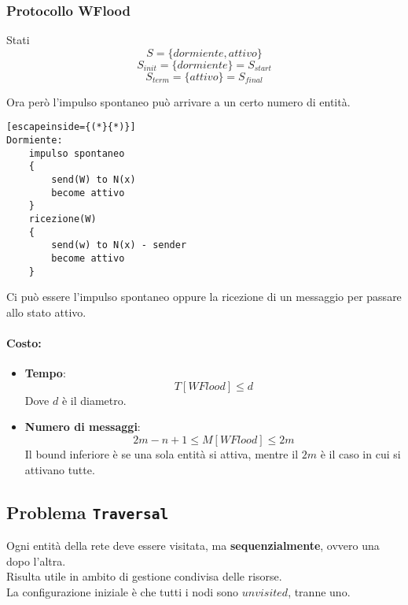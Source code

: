 \subsubsection{Protocollo WFlood}
Stati
$$ S = \{dormiente, attivo\} $$
$$ S_{init} = \{dormiente\} = S_{start} $$
$$ S_{term} = \{attivo\} = S_{final} $$

Ora però l'impulso spontaneo può arrivare a un certo numero di entità.\\

\begin{lstlisting}[escapeinside={(*}{*)}]
Dormiente:
	impulso spontaneo
	{
		send(W) to N(x)
		become attivo
	}
	ricezione(W)
	{
		send(w) to N(x) - sender
		become attivo
	}
\end{lstlisting}

Ci può essere l'impulso spontaneo oppure la ricezione di un messaggio per passare allo stato attivo.\\

\newpage

\paragraph{Costo:}
\begin{itemize}
	\item \textbf{Tempo}: 
	$$ T[WFlood] \leq d $$
	Dove $d$ è il diametro.\\
	
	\item \textbf{Numero di messaggi}:
	$$ 2m - n + 1 \leq M[WFlood] \leq 2m $$
	Il bound inferiore è se una sola entità si attiva, mentre il $2m$ è il caso in cui si attivano tutte.\\
\end{itemize}


\newpage

\subsection{Problema \texttt{Traversal}}

Ogni entità della rete deve essere visitata, ma \textbf{sequenzialmente}, ovvero una dopo l'altra.\\
Risulta utile in ambito di gestione condivisa delle risorse.\\

La configurazione iniziale è che tutti i nodi sono $unvisited$, tranne uno.\\

